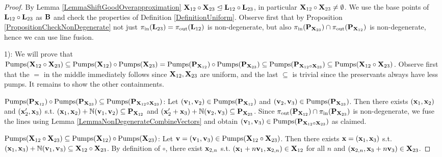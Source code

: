 \begin{proof}
By Lemma \ref{LemmaShiftGoodOverapproximation} \(\mathbf{X}_{12} \circ \mathbf{X}_{23} \trianglelefteq \mathbf{L}_{12} \circ \mathbf{L}_{23}\), in particular \(\mathbf{X}_{12} \circ \mathbf{X}_{23} \neq \emptyset\). We use the base points of \(\mathbf{L}_{12} \circ \mathbf{L}_{23}\) as \(\mathbf{B}\) and check the properties of Definition \ref{DefinitionUniform}. Observe first that by Proposition \ref{PropositionCheckNonDegenerate} not just \(\pi_{\text{in}}(\mathbf{L}_{23})=\pi_{\text{out}}(\mathbf{L}_{12})\) is non-degenerate, but also \(\pi_{\text{in}}(\mathbf{P}_{\mathbf{X}_{23}}) \cap \pi_{\text{out}}(\mathbf{P}_{\mathbf{X}_{12}})\) is non-degenerate, hence we can use line fusion.

1): We will prove that \(\operatorname{Pumps}(\mathbf{X}_{12} \circ \mathbf{X}_{23}) \subseteq \operatorname{Pumps}(\mathbf{X}_{12}) \circ \operatorname{Pumps}(\mathbf{X}_{23}) = \operatorname{Pumps}(\mathbf{P}_{\mathbf{X}_{12}}) \circ \operatorname{Pumps}(\mathbf{P}_{\mathbf{X}_{23}}) \subseteq \operatorname{Pumps}(\mathbf{P}_{\mathbf{X}_{12} \circ \mathbf{X}_{23}}) \subseteq \operatorname{Pumps}(\mathbf{X}_{12} \circ \mathbf{X}_{23})\). Observe first that the \(=\) in the middle immediately follows since \(\mathbf{X}_{12}, \mathbf{X}_{23}\) are uniform, and the last \(\subseteq\) is trivial since the preservants always have less pumps. It remains to show the other containments.

\(\operatorname{Pumps}(\mathbf{P}_{\mathbf{X}_{12}}) \circ \operatorname{Pumps}(\mathbf{P}_{\mathbf{X}_{23}}) \subseteq \operatorname{Pumps}(\mathbf{P}_{\mathbf{X}_{12} \circ \mathbf{X}_{23}})\): Let \((\mathbf{v}_1, \mathbf{v}_2) \in \operatorname{Pumps}(\mathbf{P}_{\mathbf{X}_{12}})\) and \((\mathbf{v}_2, \mathbf{v}_3) \in \operatorname{Pumps}(\mathbf{P}_{\mathbf{X}_{23}})\). Then there exists \((\mathbf{x}_1, \mathbf{x}_2)\) and \((\mathbf{x}_2', \mathbf{x}_3)\) s.t. \((\mathbf{x}_1, \mathbf{x}_2)+\mathbb{N}(\mathbf{v}_1, \mathbf{v}_2) \subseteq \mathbf{P}_{\mathbf{X}_{12}}\) and \((\mathbf{x}_2'+\mathbf{x}_3)+\mathbb{N} (\mathbf{v}_2, \mathbf{v}_3) \subseteq \mathbf{P}_{\mathbf{X}_{23}}\). Since \(\pi_{\text{out}}(\mathbf{P}_{\mathbf{X}_{12}}) \cap \pi_{\text{in}}(\mathbf{P}_{\mathbf{X}_{23}})\) is non-degenerate, we fuse the lines using Lemma \ref{LemmaNonDegenerateCombineVectors} and obtain \((\mathbf{v}_1, \mathbf{v}_3) \in \operatorname{Pumps}(\mathbf{P}_{\mathbf{X}_{12} \circ \mathbf{X}_{23}})\) as claimed.

\(\operatorname{Pumps}(\mathbf{X}_{12} \circ \mathbf{X}_{23}) \subseteq \operatorname{Pumps}(\mathbf{X}_{12}) \circ \operatorname{Pumps}(\mathbf{X}_{23})\): Let \(\mathbf{v}=(\mathbf{v}_1, \mathbf{v}_3) \in \operatorname{Pumps}(\mathbf{X}_{12} \circ \mathbf{X}_{23})\). Then there exists \(\mathbf{x}=(\mathbf{x}_1, \mathbf{x}_3)\) s.t. \((\mathbf{x}_1, \mathbf{x}_3)+\mathbb{N} (\mathbf{v}_1, \mathbf{v}_3) \subseteq \mathbf{X}_{12} \circ \mathbf{X}_{23}\). By definition of \(\circ\), there exist \(\mathbf{x}_{2,n}\) s.t. \((\mathbf{x}_1+n \mathbf{v}_1, \mathbf{x}_{2,n})\in \mathbf{X}_{12}\) for all \(n\) and \((\mathbf{x}_{2,n}, \mathbf{x}_3+n \mathbf{v}_3) \in \mathbf{X}_{23}\).


\end{proof}
